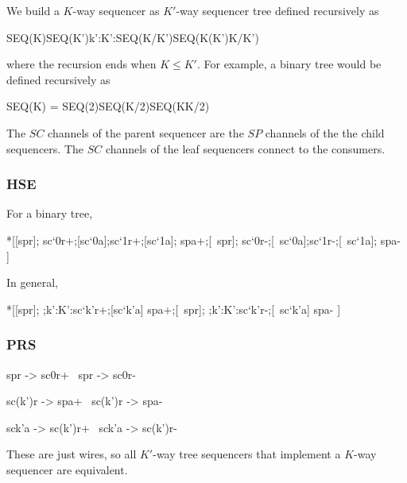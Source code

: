 \documentclass[aer.tex]{subfiles}
\begin{document}
\noindent
We build a $K$-way sequencer as $K'$-way sequencer tree defined recursively as

\begin{csp}
SEQ(K)\equiv\!SEQ(K')\pll\langle\pll\!k':K':SEQ(K/K')\rangle\pll\!SEQ(K\-(K')K/K')
\end{csp}

\noindent where the recursion ends when $K\le K'$. For example, a binary tree
would be defined recursively as

\begin{csp}
SEQ(K) = SEQ(2)\pll\!SEQ(K/2)\pll\!SEQ(K\-K/2)
\end{csp}

\noindent
The $SC$ channels of the parent sequencer are the $SP$ channels of the the child 
sequencers. The $SC$ channels of the leaf sequencers connect to the consumers.

\subsubsection*{HSE}

For a binary tree,

\begin{hse}
*[[spr];
  sc`0r+;[sc`0a];sc`1r+;[sc`1a];
  spa+;[~spr];
  sc`0r-;[~sc`0a];sc`1r-;[~sc`1a];
  spa-
 ]
\end{hse}

\noindent
In general,

\begin{hse}
*[[spr];
  \langle;k':K':sc`k'r+;[sc`k'a]\rangle
  spa+;[~spr];
  \langle;k':K':sc`k'r-;[~sc`k'a]\rangle
  spa-
 ]
\end{hse}

\subsubsection*{PRS}

\begin{prs2}
spr -> sc0r+
~spr -> sc0r-

sc(k')r -> spa+
~sc(k')r -> spa-
\end{prs2}

\begin{prs2}
sck'a -> sc(k')r+
~sck'a -> sc(k')r-
\end{prs2}

\noindent
These are just wires, so all $K'$-way tree sequencers that implement a 
$K$-way sequencer are equivalent.

\end{document}
